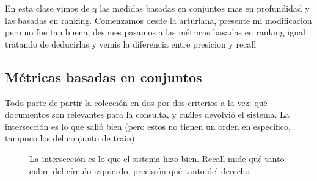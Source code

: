 \documentclass[11pt,letterpaper]{article}
\begin{document}
\newpage



\begin{quick_sum}
    En esta clase vimos de q las medidas basadas en conjuntos mas en profundidad
    y las basadas en ranking. Comenzamos desde la arturiana, presente mi 
    modificacion pero no fue tan buena, despues pasamos a las métricas basadas en ranking
    igual tratando de deducirlas y vemis la diferencia entre presicion y recall
\end{quick_sum}

\subsection*{Métricas basadas en conjuntos}

Todo parte de partir la colección en dos por dos criterios a la vez:
qué documentos son relevantes para la consulta, y cuáles devolvió el
sistema. La intersección es lo que salió bien (pero estos no tienen un orden en
especifico, tampoco los del conjunto de train)

\begin{figure}[htbp]
  \centering
  \caption{La intersección es lo que el sistema hizo bien. Recall
    mide qué tanto cubre del círculo izquierdo, precisión qué tanto
    del derecho}
  \label{fig:conjuntos-ir}
\end{figure}
\end{document}
